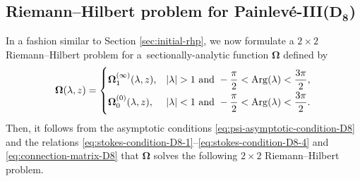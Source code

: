 \documentclass[pdftex]{sigma}
\numberwithin{equation}{section}
\renewcommand{\arg}{\operatorname{Arg}}
\begin{document}
\subsection[Riemann--Hilbert problem for Painlev\'e-III(D\_8)]{Riemann--Hilbert problem for Painlev\'e-III($\boldsymbol{D_8}$)} In a fashion similar to Section \ref{sec:initial-rhp}, we now formulate a $2\times 2$ Riemann--Hilbert problem for a~sectionally-analytic function ${\mathbf{\Omega}}$ defined by
\[
{\mathbf{\Omega}}(\lambda, z) =
 \begin{cases}
\mathbf \Omega_1^{(\infty)}(\lambda, z) , & |\lambda| >1 \ \text{and} \ -\dfrac{\pi}{2} < \arg (\lambda) < \dfrac{3\pi}{2}, \vspace{1mm}\\
\mathbf \Omega_0^{(0)}(\lambda, z) , & |\lambda| <1 \ \text{and} \ -\dfrac{\pi}{2} < \arg (\lambda) < \dfrac{3\pi}{2}.
\end{cases}
\]
Then, it follows from the asymptotic conditions \eqref{eq:psi-asymptotic-condition-D8} and the relations \eqref{eq:stokes-condition-D8-1}--\eqref{eq:stokes-condition-D8-4} and \eqref{eq:connection-matrix-D8} that $\mathbf{\Omega}$ solves the following $2 \times 2$ Riemann--Hilbert problem.
\end{document}
